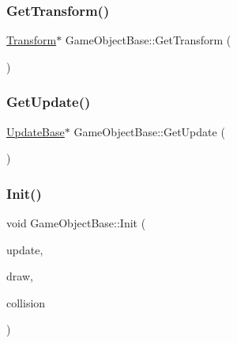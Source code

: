 \mbox{\label{class_game_object_base_a7df1e16838f8fa578a27e8ba64652b49}} 
\subsubsection{\texorpdfstring{Get\+Transform()}{GetTransform()}}
{\footnotesize\ttfamily \mbox{\hyperlink{class_transform}{Transform}}$\ast$ Game\+Object\+Base\+::\+Get\+Transform (\begin{DoxyParamCaption}{ }\end{DoxyParamCaption})\hspace{0.3cm}{\ttfamily [inline]}}

\mbox{\label{class_game_object_base_a177985be1be1252df6588fa29f2c7f41}} 
\subsubsection{\texorpdfstring{Get\+Update()}{GetUpdate()}}
{\footnotesize\ttfamily \mbox{\hyperlink{class_update_base}{Update\+Base}}$\ast$ Game\+Object\+Base\+::\+Get\+Update (\begin{DoxyParamCaption}{ }\end{DoxyParamCaption})\hspace{0.3cm}{\ttfamily [inline]}}

\mbox{\label{class_game_object_base_aca14cf5d66f945347653c4965876e75b}} 
\subsubsection{\texorpdfstring{Init()}{Init()}}
{\footnotesize\ttfamily void Game\+Object\+Base\+::\+Init (\begin{DoxyParamCaption}\item[{\mbox{\hyperlink{class_update_base}{Update\+Base}} $\ast$}]{update,  }\item[{\mbox{\hyperlink{class_draw_base}{Draw\+Base}} $\ast$}]{draw,  }\item[{\mbox{\hyperlink{class_collision_base}{Collision\+Base}} $\ast$}]{collision }\end{DoxyParamCaption})\hspace{0.3cm}{\ttfamily [protected]}}



